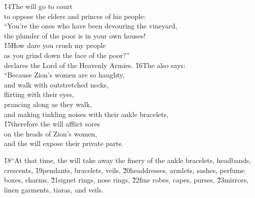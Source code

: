 \begin{poetry}
\poeml \v{14}The  will go to court \\
\poemll    to oppose the elders and princes of his people: \\
\poeml ``You're the ones who have been devouring the vineyard, \\
\poemll    the plunder of the poor is in your own houses! \\
\poeml \v{15}How dare you crush my people \\
\poemll    as you grind down the face of the poor?'' \\
\poemlll       declares the Lord  of the Heavenly Armies.
\poeml \v{16}The  also says: \\
\poeml ``Because Zion's women are so haughty, \\
\poemll    and walk with outstretched necks, \\
\poeml flirting with their eyes, \\
\poemll    prancing along as they walk, \\
\poemlll       and making tinkling noises with their ankle bracelets, \\
\poeml \v{17}therefore the  will afflict sores \\
\poemll    on the heads of Zion's women, \\
\poemlll       and the  will expose their private parts.
\end{poetry}

\v{18}``At that time, the  will take away the finery of the ankle bracelets, headbands, crescents, \v{19}pendants, bracelets, veils, \v{20}headdresses, armlets, sashes, perfume boxes, charms, \v{21}signet rings, nose rings, \v{22}fine robes, capes, purses, \v{23}mirrors, linen garments, tiaras, and veils.

